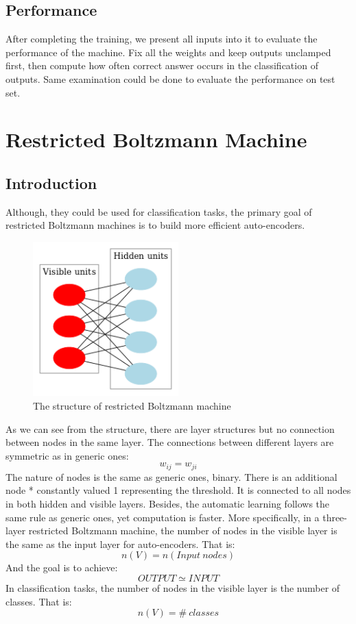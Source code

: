\documentclass{article}
\begin{document}
\subsection{Performance}
After completing the training, we present all inputs into it to evaluate the performance of the machine. Fix all the weights and keep outputs unclamped first, then compute how often correct answer occurs in the classification of outputs. Same examination could be done to evaluate the performance on test set.
\clearpage
\section{Restricted Boltzmann Machine}
\subsection{Introduction}
Although, they could be used for classification tasks, the primary goal of restricted Boltzmann machines is to build more efficient auto-encoders.
\begin{figure}[H]
 \centering
 \includegraphics[width=0.5\textwidth]{Restricted_Boltzmann_machine.jpg}
 \caption{The structure of restricted Boltzmann machine}\label{}
 \end{figure}
As we can see from the structure, there are layer structures but no connection between nodes in the same layer. The connections between different layers are symmetric as in generic ones:
\[w_{ij}=w_{ji}\]
The nature of nodes is the same as generic ones, binary. There is an additional node * constantly valued 1 representing the threshold. It is connected to all nodes in both hidden and visible layers. Besides, the automatic learning follows the same rule as generic ones, yet computation is faster. More specifically, in a three-layer restricted Boltzmann machine, the number of nodes in the visible layer is the same as the input layer for auto-encoders. That is:
\[n(V)=n(Input\ nodes)\]
And the goal is to achieve:
\[OUTPUT\simeq INPUT\]
In classification tasks, the number of nodes in the visible layer is the number of classes. That is:
\[n(V)=\# \ classes\]
\end{document}
